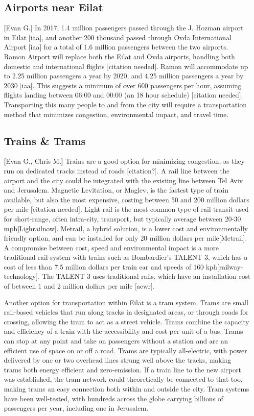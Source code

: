 \documentclass[12pt]{article}                         %
\begin{document}
\subsection{Airports near Eilat}[Evan G.]
In 2017, 1.4 million passengers passed through the J. Hozman airport in Eilat [iaa], and another 200 thousand passed through Ovda International Airport [iaa] for a total of 1.6 million passengers between the two airports. Ramon Airport will replace both the Eilat and Ovda airports, handling both domestic and international flights [citation needed]. Ramon will accommodate up to 2.25 million passengers a year by 2020, and 4.25 million passengers a year by 2030 [iaa]. This suggests a minimum of over 600 passengers per hour, assuming flights landing between 06:00 and 00:00 (an 18 hour schedule) [citation needed]. Transporting this many people to and from the city will require a transportation method that minimizes congestion, environmental impact, and travel time.

\subsection{Trains \& Trams}[Evan G., Chris M.]
Trains are a good option for minimizing congestion, as they run on dedicated tracks instead of roads [citation?]. A rail line between the airport and the city could be integrated with the existing line between Tel Aviv and Jerusalem. Magnetic Levitation, or Maglev, is the fastest type of train available, but also the most expensive, costing between 50 and 200 million dollars per mile [citation needed]. Light rail is the most common type of rail transit used for short-range, often intra-city, transport, but typically average between 20-30 mph[Lighrailnow]. Metrail, a hybrid solution, is a lower cost and environmentally friendly option, and can be installed for only 20 million dollars per mile[Metrail]. A compromise between cost, speed and environmental impact is a more traditional rail system with trains such as Bombardier's TALENT 3, which has a cost of less than 7.5 million dollars per train car and speeds of 160 kph[railway-technology]. The TALENT 3 uses traditional rails, which have an installation cost of between 1 and 2 million dollars per mile [acwr].

Another option for transportation within Eilat is a tram system. Trams are small rail-based vehicles that run along tracks in designated areas, or through roads for crossing, allowing the tram to act as a street vehicle. Trams combine the capacity and efficiency of a train with the accessibility and cost per unit of a bus. Trams can stop at any point and take on passengers without a station and are an efficient use of space on or off a road. Trams are typically all-electric, with power delivered by one or two overhead lines strung well above the tracks, making trams both energy efficient and zero-emission. If a train line to the new airport was established, the tram network could theoretically be connected to that too, making trams an easy connection both within and outside the city. Tram systems have been well-tested, with hundreds across the globe carrying billions of passengers per year, including one in Jerusalem.
\end{document}
